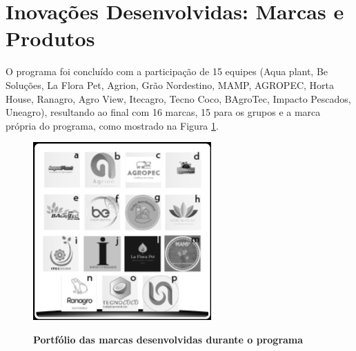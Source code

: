 \section{Inovações Desenvolvidas: Marcas e Produtos}
\label{inovacoes}

O programa foi concluído  com a participação de 15 equipes (Aqua plant, Be Soluções, La Flora Pet, Agrion, Grão Nordestino, MAMP, AGROPEC, Horta House, Ranagro, Agro View, Itecagro, Tecno Coco, BAgroTec, Impacto Pescados, Uneagro), resultando ao final com 16 marcas, 15 para os grupos e a marca própria do programa, como mostrado na Figura \ref{figura_12}.




\begin{figure}[H]
\centering
\caption{\textbf{Portfólio das marcas desenvolvidas durante o programa}}
\includegraphics[scale=1]{Imagens/portfolio.png}
\label{figura_12}
\end{figure}


